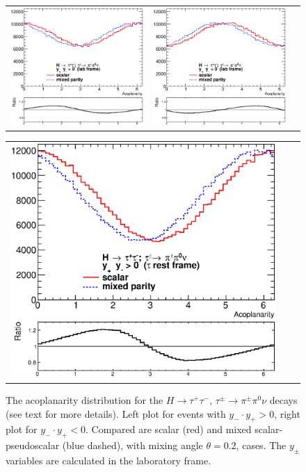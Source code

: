 \documentclass[12pt]{article}
\begin{document}
\begin{figure}[htp!]
\begin{tabular}{ccc}
  \includegraphics[width=0.48\columnwidth]{coplanarity-angle-C.eps} &
  \includegraphics[width=0.48\columnwidth]{coplanarity-angle-D.eps} 
\end{tabular}
\caption{
The acoplanarity distribution for the $H \to \tau^+ \tau^- $, $\tau^\pm \to \pi^\pm \pi^0 \nu$ decays
(see text for more details). Left plot for events with  $y_- \cdot y_+ >0$, right plot for  $y_- \cdot y_+ <0$.
Compared are scalar (red) and mixed scalar-pseudoscalar (blue dashed), with mixing angle $\theta=0.2$, cases.
The  $y_\pm$ variables are calculated in the laboratory frame.
\label{fig:rhorho}}
\begin{tabular}{ccc}
  \includegraphics[width=0.48\columnwidth]{coplanarity-angle-C-tau.eps} &

\end{tabular}
\end{figure}
\end{document}
